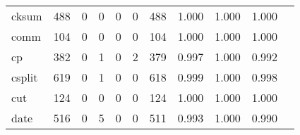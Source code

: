 \begin{longtable}{lp{1.2cm}p{1.2cm}p{1.2cm}p{1.2cm}p{1.2cm}p{1.2cm}p{1.2cm}p{1.2cm}p{1.2cm}p{1.2cm}}
cksum     &                                   488 &                                                  0 &                                                  0 &                                                  0 &                                                  0 &                                                488 &                                         1.000 &                                              1.000 &                                              1.000 \\
comm      &                                   104 &                                                  0 &                                                  0 &                                                  0 &                                                  0 &                                                104 &                                         1.000 &                                              1.000 &                                              1.000 \\
cp        &                                   382 &                                                  0 &                                                  1 &                                                  0 &                                                  2 &                                                379 &                                         0.997 &                                              1.000 &                                              0.992 \\
csplit    &                                   619 &                                                  0 &                                                  1 &                                                  0 &                                                  0 &                                                618 &                                         0.999 &                                              1.000 &                                              0.998 \\
cut       &                                   124 &                                                  0 &                                                  0 &                                                  0 &                                                  0 &                                                124 &                                         1.000 &                                              1.000 &                                              1.000 \\
date      &                                   516 &                                                  0 &                                                  5 &                                                  0 &                                                  0 &                                                511 &                                         0.993 &                                              1.000 &                                              0.990 \\

\end{longtable}
